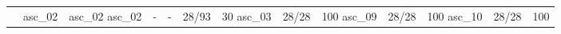 \begin{tabular}{lrrrrrrrr}
\toprule
 & asc_02 & asc_02 %
\midrule
asc_02 & - & - & 28/93 & 30%
asc_03 & 28/28 & 100%
asc_09 & 28/28 & 100%
asc_10 & 28/28 & 100%
\bottomrule
\end{tabular}
